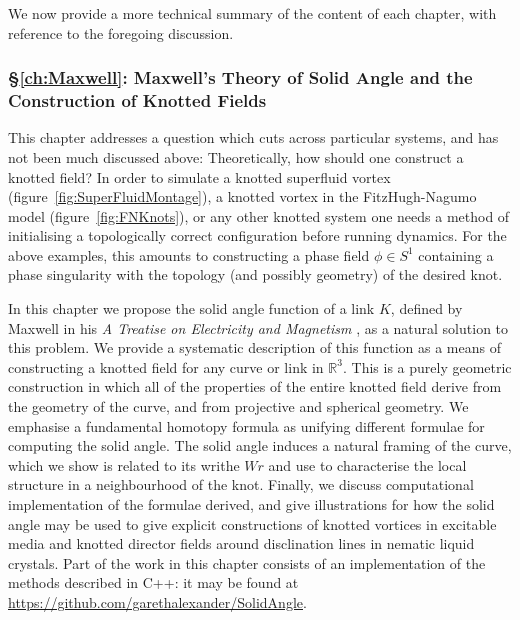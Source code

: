 We now provide a more technical summary of the content of each chapter, with reference to the foregoing discussion.

\subsubsection{\S \ref{ch:Maxwell}: Maxwell's Theory of Solid Angle and the Construction of Knotted Fields}

This chapter addresses a question which cuts across particular systems, and has not been much discussed above: Theoretically, how should one construct a knotted field? In order to simulate a knotted superfluid vortex (figure~\ref{fig:SuperFluidMontage}), a knotted vortex in the FitzHugh-Nagumo model (figure~\ref{fig:FNKnots}), or any other knotted system one needs a method of initialising a topologically correct configuration before running dynamics. For the above examples, this amounts to constructing a phase field $\phi \in S^1$ containing a phase singularity with the topology (and possibly geometry) of the desired knot. 

In this chapter we propose the solid angle function of a link $K$, defined by Maxwell in his \emph{A Treatise on Electricity and Magnetism} \citep{Maxwell2}, as a natural solution to this problem. We provide a systematic description of this function as a means of constructing a knotted field for any curve or link in $\mathbb{R}^3$. This is a purely geometric construction in which all of the properties of the entire knotted field derive from the geometry of the curve, and from projective and spherical geometry. We emphasise a fundamental homotopy formula as unifying different formulae for computing the solid angle. The solid angle induces a natural framing of the curve, which we show is related to its writhe $Wr$ and use to characterise the local structure in a neighbourhood of the knot. Finally, we discuss computational implementation of the formulae derived, and give illustrations for how the solid angle may be used to give explicit constructions of knotted vortices in excitable media and knotted director fields around disclination lines in nematic liquid crystals. Part of the work in this chapter consists of an implementation of the methods described in C++: it may be found at \href{https://github.com/garethalexander/SolidAngle}{https://github.com/garethalexander/SolidAngle}.


